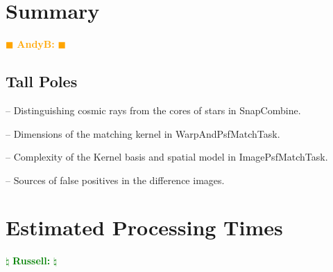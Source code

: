 \documentclass[12pt]{article}
\newcommand{\becker} { \textcolor{orange} {
\ensuremath{\blacksquare} {\bf AndyB:}  
\ensuremath{\blacksquare} } }
\newcommand{\russ} { \textcolor{green} {
\ensuremath{\natural} {\bf Russell:}  
\ensuremath{\natural} } }
\begin{document}
\clearpage 
\section{Summary} \becker

\subsection{Tall Poles}

-- Distinguishing cosmic rays from the cores of stars in SnapCombine.

-- Dimensions of the matching kernel in WarpAndPsfMatchTask.

-- Complexity of the Kernel basis and spatial model in ImagePsfMatchTask.

-- Sources of false positives in the difference images.



\clearpage 
\section{Estimated Processing Times} \russ
\end{document}

